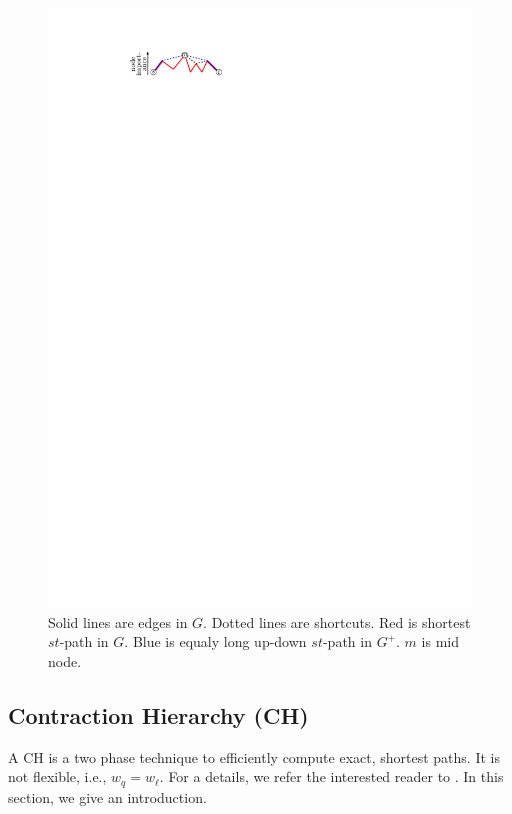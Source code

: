 \documentclass[letterpaper]{article} %
\begin{document}
\begin{figure}
\centering
\includegraphics{fig/ch}
\caption{
Solid lines are edges in $G$. Dotted lines are shortcuts. Red is shortest $st$-path in $G$. Blue is equaly long up-down $st$-path in $G^+$. $m$ is mid node.
}
\label{fig:ch}
\end{figure}

\subsection{Contraction Hierarchy (CH)}

A CH is a two phase technique to efficiently compute exact, shortest paths.
It is not flexible, i.e., $w_q=w_\ell$.
For a details, we refer the interested reader to \cite{gssv-erlrn-12,dsw-cch-15}.
In this section, we give an introduction.
\end{document}
